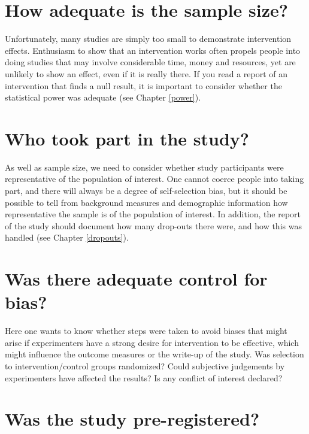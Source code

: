 \documentclass{krantz}
\begin{document}
\hypertarget{how-adequate-is-the-sample-size}{%
\section{How adequate is the sample size?}\label{how-adequate-is-the-sample-size}}

Unfortunately, many studies are simply too small to demonstrate intervention effects. Enthusiasm to show that an intervention works often propels people into doing studies that may involve considerable time, money and resources, yet are unlikely to show an effect, even if it is really there. If you read a report of an intervention that finds a null result, it is important to consider whether the statistical power was adequate (see Chapter \ref{power}).

\hypertarget{who-took-part-in-the-study}{%
\section{Who took part in the study?}\label{who-took-part-in-the-study}}

As well as sample size, we need to consider whether study participants were representative of the population of interest. One cannot coerce people into taking part, and there will always be a degree of self-selection bias, but it should be possible to tell from background measures and demographic information how representative the sample is of the population of interest. In addition, the report of the study should document how many drop-outs there were, and how this was handled (see Chapter \ref{dropouts}).

\hypertarget{was-there-adequate-control-for-bias}{%
\section{Was there adequate control for bias?}\label{was-there-adequate-control-for-bias}}

Here one wants to know whether steps were taken to avoid biases that might arise if experimenters have a strong desire for intervention to be effective, which might influence the outcome measures or the write-up of the study. Was selection to intervention/control groups randomized? Could subjective judgements by experimenters have affected the results? Is any conflict of interest declared?

\hypertarget{was-the-study-pre-registered}{%
\section{Was the study pre-registered?}\label{was-the-study-pre-registered}}
\end{document}
